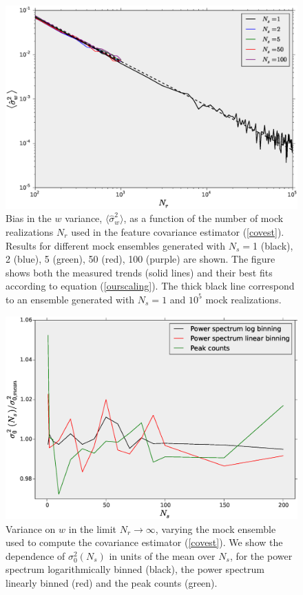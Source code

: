 \documentclass[reprint,aps,prd,superscriptaddress,showkeys,showpacs]{revtex4-1}
\newcommand{\h}[1]{\hat{#1}}
\begin{document}
\begin{figure}
\includegraphics[scale=0.3]{Figures/scaling_nr.eps}
\caption{Bias in the $w$ variance, $\langle\h{\sigma}^2_w\rangle$, as a function of the number of mock realizations $N_r$ used in the feature covariance estimator (\ref{covest}). Results for different mock ensembles generated with $N_s=$1 (black), 2 (blue), 5 (green), 50 (red), 100 (purple) are shown. The figure shows both the measured trends (solid lines) and their best fits according to equation (\ref{ourscaling}). The thick black line correspond to an ensemble generated with $N_s=1$ and $10^5$ mock realizations. }
\label{wvar_nr}
\end{figure}

\begin{figure}
\includegraphics[scale=0.3]{Figures/scaling_ns.eps}
\caption{Variance on $w$ in the limit $N_r\rightarrow\infty$, varying the mock ensemble used to compute the covariance estimator (\ref{covest}). We show the dependence of $\sigma_0^2(N_s)$ in units of the mean over $N_s$, for the power spectrum logarithmically binned (black), the power spectrum linearly binned (red) and the peak counts (green).}
\label{wvar_ns}
\end{figure}
\end{document}

